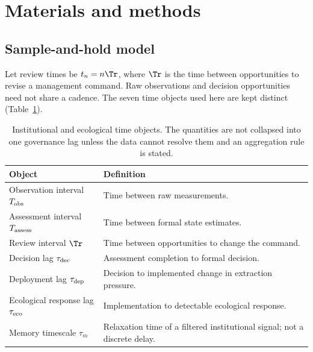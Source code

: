 \section{Materials and methods}\label{sec:methods}

\subsection{Sample-and-hold model}\label{sec:model}

Let review times be \(t_n=n\Tr\), where \(\Tr\) is the time between opportunities to revise a management command. Raw observations and decision opportunities need not share a cadence. The seven time objects used here are kept distinct (Table~\ref{tab:clocks}).

\begin{table}[htbp]
\centering\small
\caption{Institutional and ecological time objects. The quantities are not collapsed into one governance lag unless the data cannot resolve them and an aggregation rule is stated.}
\label{tab:clocks}
\begin{tabularx}{\linewidth}{@{}lX@{}}
\toprule
Object & Definition \\
\midrule
Observation interval \(T_{\rm obs}\) & Time between raw measurements. \\
Assessment interval \(T_{\rm assess}\) & Time between formal state estimates. \\
Review interval \(\Tr\) & Time between opportunities to change the command. \\
Decision lag \(\tau_{\rm dec}\) & Assessment completion to formal decision. \\
Deployment lag \(\tau_{\rm dep}\) & Decision to implemented change in extraction pressure. \\
Ecological response lag \(\tau_{\rm eco}\) & Implementation to detectable ecological response. \\
Memory timescale \(\tau_m\) & Relaxation time of a filtered institutional signal; not a discrete delay. \\
\bottomrule
\end{tabularx}
\end{table}


